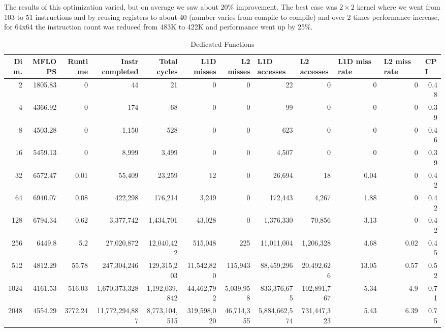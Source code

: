 \documentclass{article}
\begin{document}
The results of this optimization varied, but on average we saw about 20\% improvement. The best case was $2\times2$ kernel where we went from 103 to 51 instructions and by reusing registers to about 40 (number varies from compile to compile) and over 2 times performance increase, for 64x64 the instruction count was reduced from 483K to 422K and performance went up by 25\%.

\begin{table}[htbp]
\tiny
\caption{Dedicated Functions}
\begin{tabular}{|r|r|r|r|r|r|r|r|r|r|r|r|}
\hline
Dim. &   MFLOPS &     Runtime & Instr completed & Total cycles & L1D misses & L2 misses & \multicolumn{1}{l|}{L1D accesses} & \multicolumn{1}{l|}{ L2 accesses} & \multicolumn{1}{l|}{L1D miss rate} & \multicolumn{1}{l|}{L2 miss rate} & \multicolumn{1}{l|}{CPI} \\ \hline
2 & 1805.83 & 0 & 44 & 21 & 0 & 0 & 22 & 0 & 0 & 0 & 0.48 \\ \hline
4 & 4366.92 & 0 & 174 & 68 & 0 & 0 & 99 & 0 & 0 & 0 & 0.39 \\ \hline
8 & 4503.28 & 0 & 1,150 & 528 & 0 & 0 & 623 & 0 & 0 & 0 & 0.46 \\ \hline
16 & 5459.13 & 0 & 8,999 & 3,499 & 0 & 0 & 4,507 & 0 & 0 & 0 & 0.39 \\ \hline
32 & 6572.47 & 0.01 & 55,409 & 23,259 & 12 & 0 & 26,694 & 18 & 0.04 & 0 & 0.42 \\ \hline
64 & 6940.07 & 0.08 & 422,298 & 176,214 & 3,249 & 0 & 172,443 & 4,267 & 1.88 & 0 & 0.42 \\ \hline
128 & 6794.34 & 0.62 & 3,377,742 & 1,434,701 & 43,028 & 0 & 1,376,330 & 70,856 & 3.13 & 0 & 0.42 \\ \hline
256 & 6449.8 & 5.2 & 27,020,872 & 12,040,422 & 515,048 & 225 & 11,011,004 & 1,206,328 & 4.68 & 0.02 & 0.45 \\ \hline
512 & 4812.29 & 55.78 & 247,304,246 & 129,315,203 & 11,542,820 & 115,943 & 88,459,296 & 20,492,626 & 13.05 & 0.57 & 0.52 \\ \hline
1024 & 4161.53 & 516.03 & 1,670,373,328 & 1,192,039,842 & 44,462,792 & 5,039,958 & 833,376,675 & 102,891,767 & 5.34 & 4.9 & 0.71 \\ \hline
2048 & 4554.29 & 3772.24 & 11,772,294,887 & 8,773,104,515 & 319,598,020 & 46,714,355 & 5,884,662,574 & 731,447,323 & 5.43 & 6.39 & 0.75 \\ \hline
\end{tabular}
\label{}
\end{table}
\end{document}
